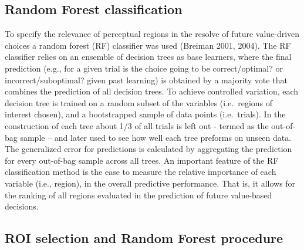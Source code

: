 \documentclass[]{article}
\begin{document}
\hypertarget{random-forest-classification}{%
\subsection{Random Forest
classification}\label{random-forest-classification}}

To specify the relevance of perceptual regions in the resolve of future
value-driven choices a random forest (RF) classifier was used (Breiman
2001, 2004). The RF classifier relies on an ensemble of decision trees
as base learners, where the final prediction (e.g., for a given trial is
the choice going to be correct/optimal? or incorrect/suboptimal? given
past learning) is obtained by a majority vote that combines the
prediction of all decision trees. To achieve controlled variation, each
decision tree is trained on a random subset of the variables
(i.e.~regions of interest chosen), and a bootstrapped sample of data
points (i.e.~trials). In the construction of each tree about 1/3 of all
trials is left out - termed as the out-of-bag sample -- and later used
to see how well each tree preforms on unseen data. The generalized error
for predictions is calculated by aggregating the prediction for every
out-of-bag sample across all trees. An important feature of the RF
classification method is the ease to measure the relative importance of
each variable (i.e., region), in the overall predictive performance.
That is, it allows for the ranking of all regions evaluated in the
prediction of future value-based decisions.

\hypertarget{roi-selection-and-random-forest-procedure}{%
\subsection{ROI selection and Random Forest
procedure}\label{roi-selection-and-random-forest-procedure}}
\end{document}
